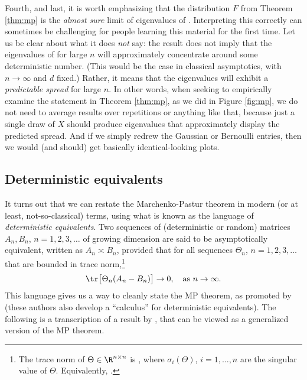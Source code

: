 \documentclass{article}
\begin{document}
Fourth, and last, it is worth emphasizing that the distribution $F$ from Theorem 
\ref{thm:mp} is the \emph{almost sure} limit of eigenvalues of . Interpreting this correctly can sometimes be challenging for
people learning this material for the first time. Let us be clear about what it
does \emph{not} say: the result does not imply that the eigenvalues of
\smash{$\hSigma$} for large $n$ will approximately concentrate around some
deterministic number. (This would be the case in classical asymptotics, with $n
\to \infty$ and $d$ fixed.) Rather, it means that the eigenvalues will exhibit a
\emph{predictable spread} for large $n$. In other words, when seeking to
empirically examine the statement in Theorem \ref{thm:mp}, as we did in Figure
\ref{fig:mp}, we do not need to average results over repetitions or anything
like that, because just a single draw of $X$ should produce eigenvalues that
approximately display the predicted spread. And if we simply redrew the Gaussian 
or Bernoulli entries, then we would (and should) get basically identical-looking
plots.   

\subsection{Deterministic equivalents}

It turns out that we can restate the Marchenko-Pastur theorem in modern (or at
least, not-so-classical) terms, using what is known as the language of
\emph{deterministic equivalents}. Two sequences of (deterministic or random)
matrices $A_n,B_n$, $n=1,2,3,\dots$ of growing dimension are said to be
asymptotically equivalent, written as $A_n \asymp B_n$, provided that for all
sequences $\Theta_n$, $n=1,2,3,\ldots$ that are bounded in trace
norm,\footnote{The trace norm of $\Theta \in \R^{n \times n}$ is
  , where
  $\sigma_i(\Theta)$, $i=1,\dots,n$ are the singular value of
  $\Theta$. Equivalently, .}   
\[
\tr \big[ \Theta_n (A_n - B_n) \big] \to 0, \quad \text{as $n \to \infty$}. 
\]
This language gives us a way to cleanly state the MP theorem, as promoted by
\citet{dobriban2021distributed} (these authors also develop a ``calculus'' for
deterministic equivalents). The following is a transcription of a result by
\citet{rubio2011spectral}, that can be viewed as a generalized version of the
MP theorem.  
\end{document}
